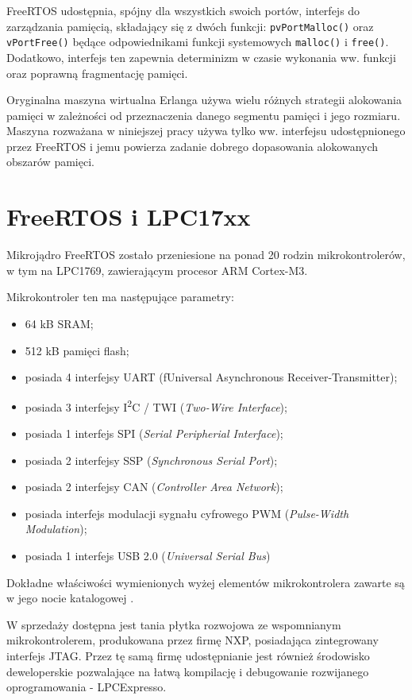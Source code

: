 FreeRTOS udostępnia, spójny dla wszystkich swoich portów, interfejs do zarządzania pamięcią, składający się z dwóch funkcji: \texttt{pvPortMalloc()} oraz \texttt{vPortFree()} będące odpowiednikami funkcji systemowych \texttt{malloc()} i \texttt{free()}. Dodatkowo, interfejs ten zapewnia determinizm w czasie wykonania ww. funkcji oraz poprawną fragmentację pamięci.

Oryginalna maszyna wirtualna Erlanga używa wielu różnych strategii alokowania pamięci w zależności od przeznaczenia danego segmentu pamięci i jego rozmiaru. Maszyna rozważana w niniejszej pracy używa tylko ww. interfejsu udostępnionego przez FreeRTOS i jemu powierza zadanie dobrego dopasowania alokowanych obszarów pamięci.

\section{FreeRTOS i LPC17xx}
\label{sec:rtosLPC}

Mikrojądro FreeRTOS zostało przeniesione na ponad 20 rodzin mikrokontrolerów, w tym na LPC1769, zawierającym procesor ARM Cortex-M3.

Mikrokontroler ten ma następujące parametry:
\begin{itemize}
\item 64 kB SRAM;
\item 512 kB pamięci flash;
\item posiada 4 interfejsy UART (f{Universal Asynchronous Receiver-Transmitter});
\item posiada 3 interfejsy I\textsuperscript{2}C / TWI (\emph{Two-Wire Interface});
\item posiada 1 interfejs SPI (\emph{Serial Peripherial Interface});
\item posiada 2 interfejsy SSP (\emph{Synchronous Serial Port});
\item posiada 2 interfejsy CAN (\emph{Controller Area Network});
\item posiada interfejs modulacji sygnału cyfrowego PWM (\emph{Pulse-Width Modulation});
\item posiada 1 interfejs USB 2.0 (\emph{Universal Serial Bus})
\end{itemize}

Dokładne właściwości wymienionych wyżej elementów mikrokontrolera zawarte są w jego nocie katalogowej \cite{NXP2014}.

W sprzedaży dostępna jest tania płytka rozwojowa ze wspomnianym mikrokontrolerem, produkowana przez firmę NXP, posiadająca zintegrowany interfejs JTAG. Przez tę samą firmę udostępnianie jest również środowisko deweloperskie pozwalające na łatwą kompilację i debugowanie rozwijanego oprogramowania - LPCExpresso.

